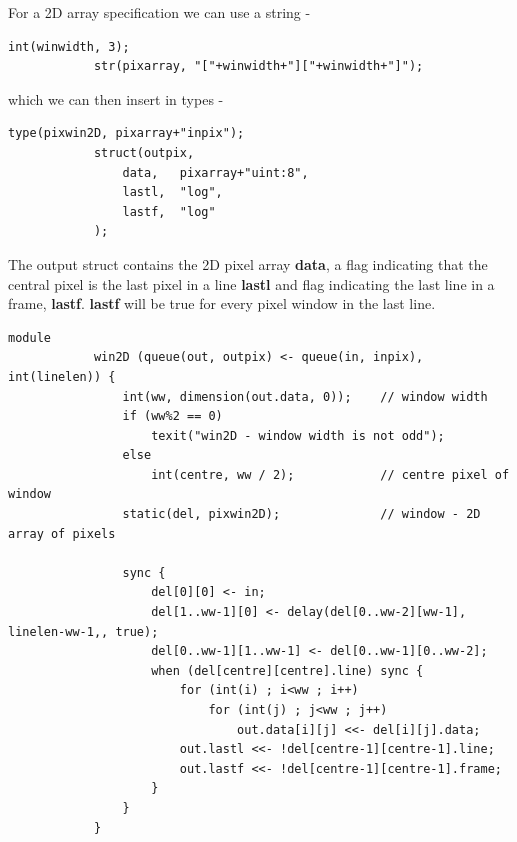         For a 2D array specification we can use a string -
        \begin{lstlisting}[gobble=8, language=threepl]
            int(winwidth, 3);
            str(pixarray, "["+winwidth+"]["+winwidth+"]");
        \end{lstlisting}
        which we can then insert in types -        
        \begin{lstlisting}[gobble=8, language=threepl]
            type(pixwin2D, pixarray+"inpix");
            struct(outpix,
                data,   pixarray+"uint:8",
                lastl,  "log",
                lastf,  "log"
            );
        \end{lstlisting}
        The output struct contains the 2D pixel array {\bf data}, a flag
        indicating that the central pixel is the last pixel in a line {\bf lastl}
        and flag indicating the last line in a frame, {\bf lastf}. {\bf lastf} will
        be true for every pixel window in the last line.



        
        
        \begin{lstlisting}[gobble=8, language=threepl]
            module
            win2D (queue(out, outpix) <- queue(in, inpix), int(linelen)) {
                int(ww, dimension(out.data, 0));    // window width
                if (ww%2 == 0)
                    texit("win2D - window width is not odd");
                else
                    int(centre, ww / 2);            // centre pixel of window
                static(del, pixwin2D);              // window - 2D array of pixels

                sync {
                    del[0][0] <- in;
                    del[1..ww-1][0] <- delay(del[0..ww-2][ww-1], linelen-ww-1,, true);
                    del[0..ww-1][1..ww-1] <- del[0..ww-1][0..ww-2];
                    when (del[centre][centre].line) sync {
                        for (int(i) ; i<ww ; i++)
                            for (int(j) ; j<ww ; j++)
                                out.data[i][j] <<- del[i][j].data;
                        out.lastl <<- !del[centre-1][centre-1].line;
                        out.lastf <<- !del[centre-1][centre-1].frame;
                    }
                }
            }
        \end{lstlisting}
        
